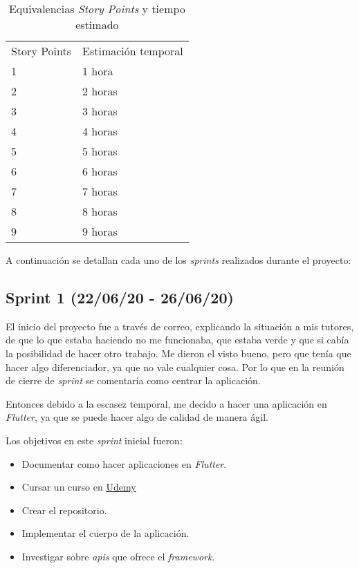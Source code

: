 \begin{table}[H]
	\centering
	\begin{tabular}{l l }
		\toprule
		{Story Points} & Estimación temporal \\
		1            & 1 hora              \\ 
		2            & 2 horas           \\ 
		3            & 3 horas             \\ 
		4            & 4 horas           \\ 
		5            & 5 horas             \\ 
		6            & 6 horas           \\ 
		7            & 7 horas             \\ 
		8            & 8 horas             \\ 
		9            & 9 horas             \\ \bottomrule
	\end{tabular}
	\caption{Equivalencias \emph{Story Points} y tiempo estimado}
	\label{tabla:storypoint}
\end{table}

A continuación se detallan cada uno de los \emph{sprints} realizados durante el proyecto:

\subsection{Sprint 1 (22/06/20 - 26/06/20)}\label{sprint-2-220620---260620}

El inicio del proyecto fue a través de correo, explicando la situación a mis tutores, de que lo que estaba haciendo no me funcionaba, que estaba verde y que si cabía la posibilidad de hacer otro trabajo. Me dieron el visto bueno, pero que tenía que hacer algo diferenciador, ya que no vale cualquier cosa. Por lo que en la reunión de cierre de \emph{sprint} se comentaría como centrar la aplicación. 

Entonces debido a la escasez temporal, me decido a hacer una aplicación en \emph{Flutter}, ya que se puede hacer algo de calidad de manera ágil.

Los objetivos en este \emph{sprint} inicial fueron:

\begin{itemize}
\item Documentar como hacer aplicaciones en \emph{Flutter}.
\item Cursar un curso en \href{https://www.udemy.com/course/flutter-primeros-pasos/}{Udemy}
\item Crear el repositorio.
\item Implementar el cuerpo de la aplicación.
\item Investigar sobre \emph{apis} que ofrece el \emph{framework}.
\end{itemize}

